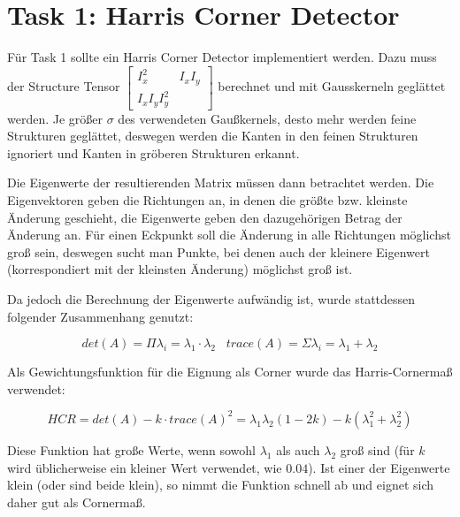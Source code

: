 
\chapter{Task 1: Harris Corner Detector}

Für Task 1 sollte ein Harris Corner Detector implementiert werden. Dazu muss der Structure Tensor $ \begin{bmatrix} I_x^2 & I_x I_y \\ I_x I_y I_y^2 \end{bmatrix} $ berechnet und mit Gausskerneln geglättet werden. Je größer $\sigma$ des verwendeten Gaußkernels, desto mehr werden feine Strukturen geglättet, deswegen werden die Kanten in den feinen Strukturen ignoriert und Kanten in gröberen Strukturen erkannt.

Die Eigenwerte der resultierenden Matrix müssen dann betrachtet werden. Die Eigenvektoren geben die Richtungen an, in denen die größte bzw. kleinste Änderung geschieht, die Eigenwerte geben den dazugehörigen Betrag der Änderung an. Für einen Eckpunkt soll die Änderung in alle Richtungen möglichst groß sein, deswegen sucht man Punkte, bei denen auch der kleinere Eigenwert (korrespondiert mit der kleinsten Änderung) möglichst groß ist.

Da jedoch die Berechnung der Eigenwerte aufwändig ist, wurde stattdessen folgender Zusammenhang genutzt:

\begin{equation}
 det(A) = \Pi \lambda_i = \lambda_1 \cdot \lambda_2 \;\;\; trace(A) = \Sigma \lambda_i = \lambda_1 + \lambda_2
\end{equation}

Als Gewichtungsfunktion für die Eignung als Corner wurde das Harris-Cornermaß verwendet:

\begin{equation}
\label{eq:hcr}
 HCR = det(A) - k \cdot trace(A)^2 = \lambda_1 \lambda_2 (1 - 2 k) - k (\lambda_1^2 + \lambda_2^2)
\end{equation}

Diese Funktion hat große Werte, wenn sowohl $\lambda_1$ als auch $\lambda_2$ groß sind (für $k$ wird üblicherweise ein kleiner Wert verwendet, wie $0.04$). Ist einer der Eigenwerte klein (oder sind beide klein), so nimmt die Funktion schnell ab und eignet sich daher gut als Cornermaß.

